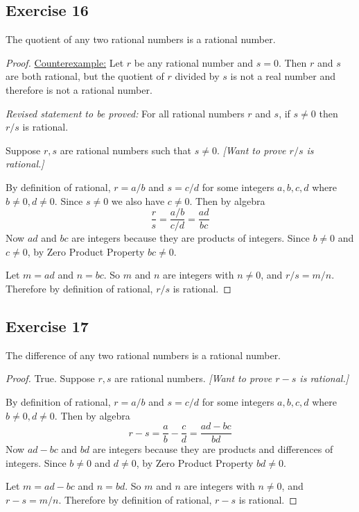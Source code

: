 \documentclass[14pt]{extarticle}
\begin{document}
\subsection{Exercise 16}
The quotient of any two rational numbers is a rational number.

\begin{proof}
\underline{Counterexample:} Let $r$ be any rational number and $s = 0$. Then $r$ and $s$ are both rational, but the quotient of $r$ divided by $s$ is not a real number and therefore is not a rational number.

{\it Revised statement to be proved:} For all rational numbers $r$ and $s$, if $s \neq 0$ then $r/s$ is rational.

Suppose $r,s$ are rational numbers such that $s \neq 0$. {\it[Want to prove $r/s$ is rational.]}

By definition of rational, $r = a/b$ and $s = c/d$ for some integers $a,b,c,d$ where $b \neq 0, d \neq 0$. Since $s \neq 0$ we also have $c \neq 0$. Then by algebra
\[
\frac{r}{s} = \frac{a/b}{c/d} = \frac{ad}{bc}
\]
Now $ad$ and $bc$ are integers because they are products of integers. Since $b \neq 0$ and $c \neq 0$, by Zero Product Property $bc \neq 0$. 

Let $m = ad$ and $n = bc$. So $m$ and $n$ are integers with $n \neq 0$, and $r / s = m / n$. Therefore by definition of rational, $r/s$ is rational.
\end{proof}

\subsection{Exercise 17}
The difference of any two rational numbers is a rational number.

\begin{proof}
True. Suppose $r,s$ are rational numbers. {\it[Want to prove $r-s$ is rational.]}

By definition of rational, $r = a/b$ and $s = c/d$ for some integers $a,b,c,d$ where $b \neq 0, d \neq 0$. Then by algebra
\[
r-s = \frac{a}{b}-\frac{c}{d} = \frac{ad-bc}{bd}
\]
Now $ad-bc$ and $bd$ are integers because they are products and differences of integers. Since $b \neq 0$ and $d \neq 0$, by Zero Product Property $bd \neq 0$. 

Let $m = ad-bc$ and $n = bd$. So $m$ and $n$ are integers with $n \neq 0$, and $r - s = m / n$. Therefore by definition of rational, $r-s$ is rational.
\end{proof}
\end{document}
